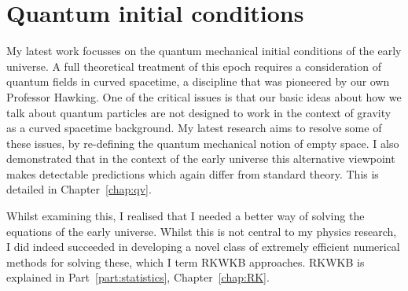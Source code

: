 \section{Quantum initial conditions}
My latest work focusses on the quantum mechanical initial conditions of the early universe. A full theoretical treatment of this epoch requires a consideration of quantum fields in curved spacetime, a discipline that was pioneered by our own Professor Hawking. One of the critical issues is that our basic ideas about how we talk about quantum particles are not designed to work in the context of gravity as a curved spacetime background. My latest research aims to resolve some of these issues, by re-defining the quantum mechanical notion of empty space. I also demonstrated that in the context of the early universe this alternative viewpoint makes detectable predictions which again differ from standard theory. This is detailed in Chapter~\ref{chap:qv}.

Whilst examining this, I realised that I needed a better way of solving the equations of the early universe. Whilst this is not central to my physics research, I did indeed succeeded in developing a novel class of extremely efficient numerical methods for solving these, which I term RKWKB approaches. RKWKB is explained in Part~\ref{part:statistics}, Chapter~\ref{chap:RK}.




